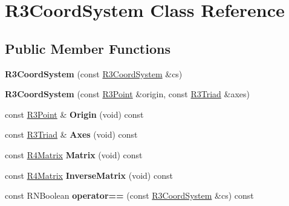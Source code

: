 \hypertarget{class_r3_coord_system}{}\section{R3\+Coord\+System Class Reference}
\label{class_r3_coord_system}
\subsection*{Public Member Functions}
\begin{DoxyCompactItemize}
\item 
{\bfseries R3\+Coord\+System} (const \hyperlink{class_r3_coord_system}{R3\+Coord\+System} \&cs)\hypertarget{class_r3_coord_system_ad647b5403983e64cd4d820e16e360ed3}{}\label{class_r3_coord_system_ad647b5403983e64cd4d820e16e360ed3}

\item 
{\bfseries R3\+Coord\+System} (const \hyperlink{class_r3_point}{R3\+Point} \&origin, const \hyperlink{class_r3_triad}{R3\+Triad} \&axes)\hypertarget{class_r3_coord_system_a57a0e0568d208718e5d6de97f5beb33b}{}\label{class_r3_coord_system_a57a0e0568d208718e5d6de97f5beb33b}

\item 
const \hyperlink{class_r3_point}{R3\+Point} \& {\bfseries Origin} (void) const \hypertarget{class_r3_coord_system_ad85af546d276d612df7582a5bb0cbefe}{}\label{class_r3_coord_system_ad85af546d276d612df7582a5bb0cbefe}

\item 
const \hyperlink{class_r3_triad}{R3\+Triad} \& {\bfseries Axes} (void) const \hypertarget{class_r3_coord_system_aeedd0f58c504b073b48c13d36dd75ceb}{}\label{class_r3_coord_system_aeedd0f58c504b073b48c13d36dd75ceb}

\item 
const \hyperlink{class_r4_matrix}{R4\+Matrix} {\bfseries Matrix} (void) const \hypertarget{class_r3_coord_system_af0adfc1c024c716dff7638b4d509ebe7}{}\label{class_r3_coord_system_af0adfc1c024c716dff7638b4d509ebe7}

\item 
const \hyperlink{class_r4_matrix}{R4\+Matrix} {\bfseries Inverse\+Matrix} (void) const \hypertarget{class_r3_coord_system_ad2c0f30ab28e7d2668095aae27527116}{}\label{class_r3_coord_system_ad2c0f30ab28e7d2668095aae27527116}

\item 
const R\+N\+Boolean {\bfseries operator==} (const \hyperlink{class_r3_coord_system}{R3\+Coord\+System} \&cs) const \hypertarget{class_r3_coord_system_a03e0943ab70ae065801dc098518e0d37}{}\label{class_r3_coord_system_a03e0943ab70ae065801dc098518e0d37}


\end{DoxyCompactItemize}
